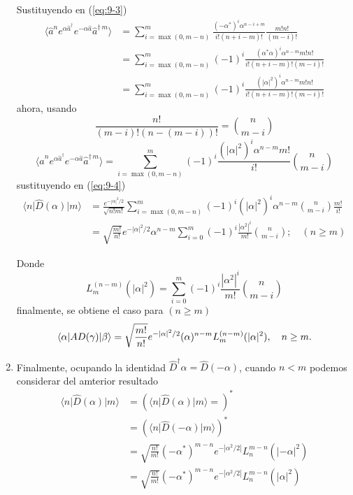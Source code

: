\begin{enumerate}
Sustituyendo en (\ref{eq:9-3})
\begin{align*}
\langle \hat{a}^{n} e^{\alpha\hat{a}^{\dagger}} e^{-\alpha \hat{a}} \hat{a}^{\dagger\,m} \rangle & = \sum_{i=\max(0,m-n)}^{m} \frac{(-\alpha^*)^{i} \alpha^{n-i+m}}{i! (n+i-m)!} \frac{m!n!}{(m-i)!}   \\
& = \sum_{i=\max(0,m-n)}^{m} (-1)^{i} \frac{(\alpha^*\alpha)^{i} \alpha^{n-m} m!n!}{i!(n+i-m)!(m-i)!} \\
& = \sum_{i=\max(0,m-n)}^{m} (-1)^{i} \frac{(|\alpha|^2)^{i} \alpha^{n-m} m!n!}{i!(n+i-m)!(m-i)!}
\end{align*}
ahora, usando
\begin{equation*}
\frac{n!}{(m-i)!(n-(m-i))!} = \binom{n }{m-i}
\end{equation*}
\begin{equation*}
\langle \hat{a}^{n} e^{\alpha\hat{a}^{\dagger}} e^{-\alpha \hat{a}} \hat{a}^{\dagger\,m} \rangle = \sum_{i=\max(0,m-n)}^{m} (-1)^{i} \frac{(|\alpha|^2)^{i} \alpha^{n-m} m!}{i!} \binom{n }{m-i}
\end{equation*}
sustituyendo en (\ref{eq:9-4})
\begin{align*}
\langle n \vert \hat{D}(\alpha) \vert m \rangle & = \frac{e^{-|\alpha|^2/2}}{\sqrt{n!m!}} \sum_{i=\max(0, m-n)}^{m} (-1)^{i} (|\alpha|^2)^{i}\alpha^{n-m} \binom{n }{m-i}\frac{m!}{i!}    \\
& = \sqrt{\frac{m!}{n!}} e^{-|\alpha|^2/2} \alpha^{n-m} \sum_{i=0}^{m}(-1)^{i} \frac{|\alpha^2|^{i}}{m!} \binom{n}{m-i} ; \quad (n\geq m)
\end{align*}

Donde
\begin{equation*}
L_m^{(n-m)}(|\alpha|^2) = \sum_{i=0}^{m}(-1)^{i} \frac{|\alpha^2|^{i}}{m!} \binom{n}{m-i}
\end{equation*}
finalmente, se obtiene el caso para $(n\geq m)$
\begin{equation*}
\langle \alpha \vert \hat{D}(\gamma) \vert \beta\rangle = \sqrt{\frac{m!}{n!}}e^{-|\alpha|^2/2}(\alpha)^{n-m}L_m^{(n-m)}(|\alpha|^2),\quad n\geq m.                                                                \\
\end{equation*}

\item Finalmente, ocupando la identidad $\hat{D}^\dagger{\alpha} = \hat{D}(-\alpha)$, cuando $n<m$ podemos considerar del amterior resultado
\begin{align*}
\langle n \vert \hat{D}(\alpha)\vert m\rangle & = \left( \langle n \vert \hat{D}(\alpha) \vert m\rangle = \right)^{*}                        \\
& = \left( \langle n \vert \hat{D}(-\alpha) \vert m\rangle \right)^{*}                          \\
& = \sqrt{\frac{n!}{m!}}(-\alpha^*)^{m-n} e^{-|\alpha^2/2|}L_n^{m-n} (|-\alpha|^2) \\
& = \sqrt{\frac{n!}{m!}}(-\alpha^*)^{m-n} e^{-|\alpha^2/2|}L_n^{m-n} (|\alpha|^2)
\end{align*}
\end{enumerate}
